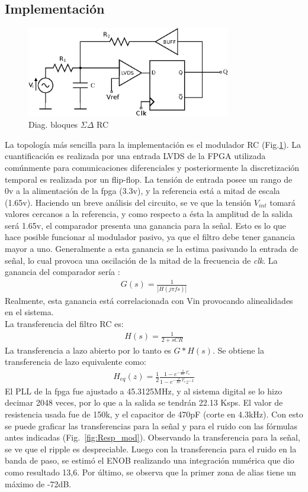 \documentclass[a4paper,conference]{IEEEtran}
\begin{document}
\subsection{Implementaci\'on}

\begin{figure}[!t]
\centering
\includegraphics[width=3.5in]{Sigma-Delta_RC}
\caption{Diag. bloques $\Sigma\Delta$ RC}
\label{fig_SDRC}
\end{figure}

La topolog\'ia m\'as sencilla para la implementaci\'on es el modulador RC (Fig.\ref{fig_SDRC}). La cuantificaci\'on es realizada por una entrada LVDS de la FPGA\cite{Sp6-IO} utilizada com\'unmente para comunicaciones diferenciales y posteriormente la discretizaci\'on temporal es realizada por un flip-flop. La tensi\'on de entrada posee un rango de 0v a la alimentación de la fpga (3.3v), y la referencia está a mitad de escala (1.65v).  Haciendo un breve an\'alisis del circuito, se ve que la tensi\'on $V_{int}$ tomar\'a valores cercanos a la referencia, y como respecto a \'esta la amplitud de la salida ser\'a 1.65v, el comparador presenta una ganancia para la se\~nal. Esto es lo que hace posible funcionar al modulador pasivo, ya que el filtro debe tener ganancia mayor a uno. Generalmente a esta ganancia se la estima pasivando la entrada de señal, lo cual provoca una oscilación de la mitad de la frecuencia de \textit{clk}. La ganancia del comparador ser\'ia :
\begin{align}
G(s)=\frac{1}{|H(j\pi fs)|}
\end{align}
Realmente, esta ganancia está correlacionada con Vin provocando alinealidades en el sistema.\\
La transferencia del filtro RC es:
\begin{align}
H(s)=\frac{1}{2+sCR}
\end{align}
La transferencia a lazo abierto por lo tanto es $G*H(s)$. 
Se obtiene la transferencia de lazo equivalente como:
\begin{align}
H_{eq}(z)=\frac{1}{2}\frac{1-e^{-\frac{2}{RC}T_s}}{1-e^{-\frac{2}{RC}T_s}z^{-1}}
\end{align}
El PLL de la fpga fue ajustado a 45.3125MHz, y al sistema digital se lo hizo decimar 2048 veces, por lo que a la salida se tendrán 22.13 Ksps. El valor de resistencia usada fue de 150k, y el capacitor de 470pF (corte en 4.3kHz).
Con esto se puede graficar las transferencias para la señal y para el ruido con las fórmulas antes indicadas (Fig.~\ref{fig:Resp_mod}). Observando la transferencia para la señal, se ve que el ripple es despreciable. Luego con la transferencia para el ruido en la banda de paso, se estimó el ENOB realizando una integraci\'on num\'erica que dio como resultado 13,6. Por último, se observa que la primer zona de alias tiene un m\'aximo de -72dB.
\end{document}
